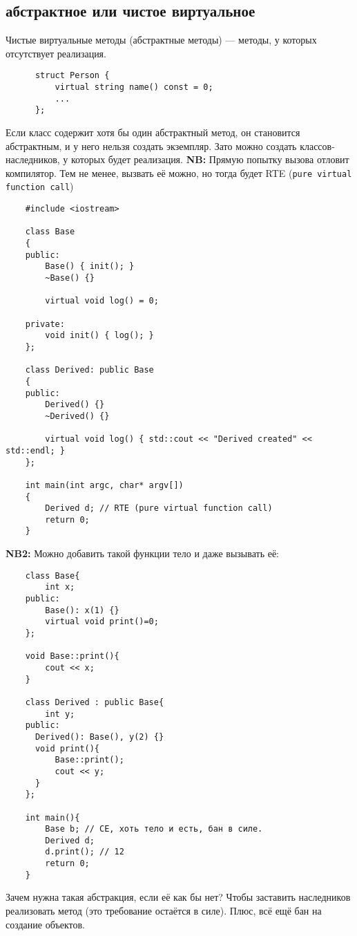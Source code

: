 \documentclass[15pt, a4paper]{article}
\newcommand{\nl}{\newline}
\begin{document}
\subsection{абстрактное или чистое виртуальное}
  Чистые виртуальные методы (абстрактные методы) --- методы, у которых отсутствует реализация.
  \begin{verbatim}
      struct Person {
          virtual string name() const = 0;
          ...
      };
  \end{verbatim}
  Если класс содержит хотя бы один абстрактный метод, он становится абстрактным, и у него нельзя создать
  экземпляр. Зато можно создать классов-наследников, у которых будет реализация. \nl
  \textbf{NB:} Прямую попытку вызова отловит компилятор. Тем не менее, вызвать её можно, но тогда будет RTE (\texttt{pure virtual function call}) \nl
  \begin{verbatim}
    #include <iostream>

    class Base
    {
    public:
        Base() { init(); }
        ~Base() {}
    
        virtual void log() = 0;
    
    private:
        void init() { log(); }	
    };
    
    class Derived: public Base
    {
    public:
        Derived() {}
        ~Derived() {}
    
        virtual void log() { std::cout << "Derived created" << std::endl; }
    };
    
    int main(int argc, char* argv[])
    {
        Derived d; // RTE (pure virtual function call)
        return 0;
    }
  \end{verbatim}
  \textbf{NB2:} Можно добавить такой функции тело и даже вызывать её:
  \begin{verbatim}
    class Base{
        int x;
    public:
        Base(): x(1) {}
        virtual void print()=0;
    };

    void Base::print(){
        cout << x;
    }

    class Derived : public Base{
        int y;
    public:
      Derived(): Base(), y(2) {}
      void print(){
          Base::print();
          cout << y;
      }
    };

    int main(){
        Base b; // CE, хоть тело и есть, бан в силе.
        Derived d;
        d.print(); // 12
        return 0;
    }
  \end{verbatim}
  Зачем нужна такая абстракция, если её как бы нет? Чтобы заставить наследников реализовать метод (это требование остаётся в силе). Плюс, всё ещё бан на создание объектов.
\end{document}
